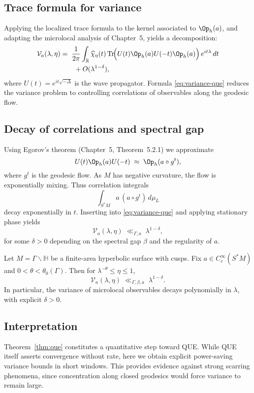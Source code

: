 \subsection{Trace formula for variance}
Applying the localized trace formula to the kernel associated to $\Op_h(a)$, and adapting the microlocal analysis of Chapter~5, yields a decomposition:
\begin{align}\label{eq:variance-que}
\mathcal{V}_a(\lambda,\eta)
&=\; \frac{1}{2\pi}\int_{\mathbb{R}} \widehat{\chi}_\eta(t)\, \mathrm{Tr}\!\Big(U(t)\Op_h(a) U(-t)\Op_h(a)\Big)\, e^{it\lambda}\,dt \\
&\qquad + O(\lambda^{1-\delta}), \nonumber
\end{align}
where $U(t)=e^{it\sqrt{-\Delta}}$ is the wave propagator. Formula \eqref{eq:variance-que} reduces the variance problem to controlling correlations of observables along the geodesic flow.

\subsection{Decay of correlations and spectral gap}
Using Egorov’s theorem (Chapter~5, Theorem~5.2.1) we approximate
\[
U(t)\Op_h(a)U(-t)\;\approx\;\Op_h(a\circ g^t),
\]
where $g^t$ is the geodesic flow. As $M$ has negative curvature, the flow is exponentially mixing. Thus correlation integrals
\[
\int_{S^*M} a\,(a\circ g^t)\, d\mu_L
\]
decay exponentially in $t$. Inserting into \eqref{eq:variance-que} and applying stationary phase yields
\begin{equation}\label{eq:que-bound}
\mathcal{V}_a(\lambda,\eta)\;\ll_{\Gamma,a}\;\lambda^{1-\delta},
\end{equation}
for some $\delta>0$ depending on the spectral gap $\beta$ and the regularity of $a$.

\begin{theorem}\label{thm:que}
Let $M=\Gamma\backslash\mathbb{H}$ be a finite-area hyperbolic surface with cusps. Fix $a\in C_c^\infty(S^*M)$ and $0<\theta<\theta_0(\Gamma)$. Then for $\lambda^{-\theta}\le \eta\le 1$,
\begin{equation}\label{eq:quant-que}
\mathcal{V}_a(\lambda,\eta)\;\ll_{\Gamma,\beta,a}\;\lambda^{1-\delta}.
\end{equation}
In particular, the variance of microlocal observables decays polynomially in $\lambda$, with explicit $\delta>0$.
\end{theorem}

\subsection{Interpretation}
Theorem~\ref{thm:que} constitutes a quantitative step toward QUE. While QUE itself asserts convergence without rate, here we obtain explicit power-saving variance bounds in short windows. This provides evidence against strong scarring phenomena, since concentration along closed geodesics would force variance to remain large.

